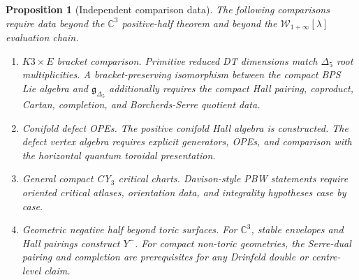 \documentclass[11pt]{article}
\newtheorem{proposition}[theorem]{Proposition}
\providecommand{\Ym}{Y^{-}}
\providecommand{\Wilpha}{\mathcal{W}_{1+\infty}}
\begin{document}
\begin{proposition}[Independent comparison data]
\label{prop:comparison-boundaries}
The following comparisons require data beyond the
$\mathbb{C}^3$ positive-half theorem and beyond the
$\Wilpha[\lambda]$ evaluation chain.
\begin{enumerate}
\item \emph{$K3\times E$ bracket comparison.}
Primitive reduced DT dimensions match $\Delta_5$ root multiplicities.
A bracket-preserving isomorphism between the compact BPS Lie algebra and
$\mathfrak{g}_{\Delta_5}$ additionally requires the compact Hall
pairing, coproduct, Cartan, completion, and Borcherds-Serre quotient
data.
\item \emph{Conifold defect OPEs.}
The positive conifold Hall algebra is constructed. The defect vertex
algebra requires explicit generators, OPEs, and comparison with the
horizontal quantum toroidal presentation.
\item \emph{General compact CY$_3$ critical charts.}
Davison-style PBW statements require oriented critical atlases,
orientation data, and integrality hypotheses case by case.
\item \emph{Geometric negative half beyond toric surfaces.}
For $\mathbb{C}^3$, stable envelopes and Hall pairings construct
$\Ym$. For compact non-toric geometries, the Serre-dual pairing and
completion are prerequisites for any Drinfeld double or centre-level
claim.
\end{enumerate}
\end{proposition}
\end{document}
